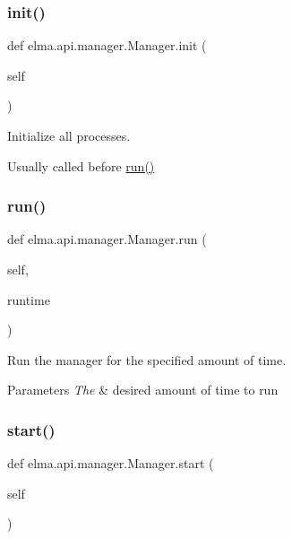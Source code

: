 \subsubsection{\texorpdfstring{init()}{init()}}
{\footnotesize\ttfamily def elma.\+api.\+manager.\+Manager.\+init (\begin{DoxyParamCaption}\item[{}]{self }\end{DoxyParamCaption})}



Initialize all processes. 

Usually called before \hyperlink{classelma_1_1api_1_1manager_1_1Manager_a241f798dcfb0cda2a47d744d8713c456}{run()} \mbox{\label{classelma_1_1api_1_1manager_1_1Manager_a241f798dcfb0cda2a47d744d8713c456}} 
\subsubsection{\texorpdfstring{run()}{run()}}
{\footnotesize\ttfamily def elma.\+api.\+manager.\+Manager.\+run (\begin{DoxyParamCaption}\item[{}]{self,  }\item[{}]{runtime }\end{DoxyParamCaption})}



Run the manager for the specified amount of time. 


\begin{DoxyParams}{Parameters}
{\em The} & desired amount of time to run \\
\hline
\end{DoxyParams}
\mbox{\label{classelma_1_1api_1_1manager_1_1Manager_a7e9916576b109e0d633c55e3854d1b78}} 
\subsubsection{\texorpdfstring{start()}{start()}}
{\footnotesize\ttfamily def elma.\+api.\+manager.\+Manager.\+start (\begin{DoxyParamCaption}\item[{}]{self }\end{DoxyParamCaption})}




